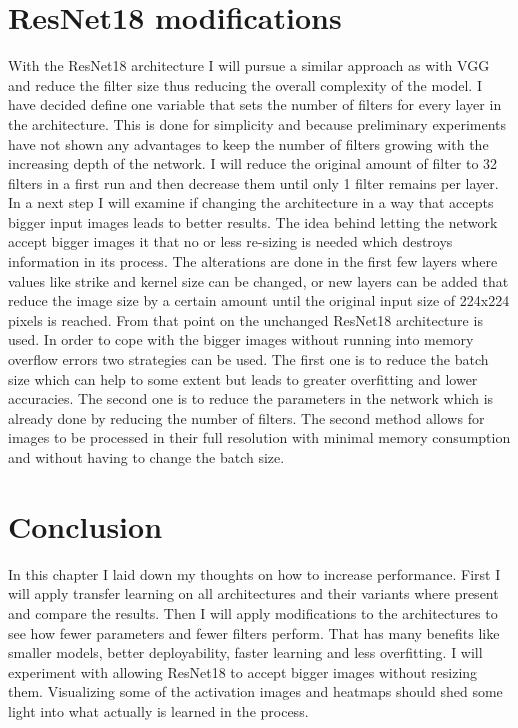 \section{ResNet18 modifications}

With the ResNet18 architecture I will pursue a similar approach as with VGG and reduce the filter size thus reducing the overall complexity of the model. I have decided define one variable that sets  the number of filters for every layer in  the architecture. This is done for  simplicity and because preliminary  experiments  have not shown any advantages to keep  the number of filters growing with the increasing depth of the network. I will reduce the  original amount of filter to 32 filters in a first run and then decrease them until only 1 filter remains per layer. \\

In a next step I will examine if changing the architecture in a way that accepts bigger input images leads to better results. The idea behind letting the network  accept bigger images it that  no or less re-sizing is  needed which destroys information in its process. The alterations are done in the first few layers where values like strike and kernel size can be changed, or new layers can be added that reduce the image size by a certain amount until the original input size of 224x224 pixels is reached. From that point on the unchanged ResNet18 architecture is used. In order to cope with the bigger images without running into memory overflow errors two strategies can be used.  The  first one is  to reduce the batch size which can  help to some extent but leads to greater overfitting and lower accuracies. The second one is to reduce the  parameters in  the network which is already done by reducing the number of filters. The second method allows for images to be processed in their full resolution with minimal memory consumption and without having to change the batch size.

\section{Conclusion}

In this chapter I laid down my thoughts on how to increase performance. First I will apply transfer learning on all architectures and their variants where present and compare the results. Then I will apply modifications to the architectures to see how fewer parameters and fewer filters perform. That has many benefits like smaller models, better deployability, faster learning and less overfitting. I will experiment with allowing ResNet18 to accept  bigger images without resizing them. Visualizing some  of the activation images and heatmaps should shed some light into what  actually is learned in the process.